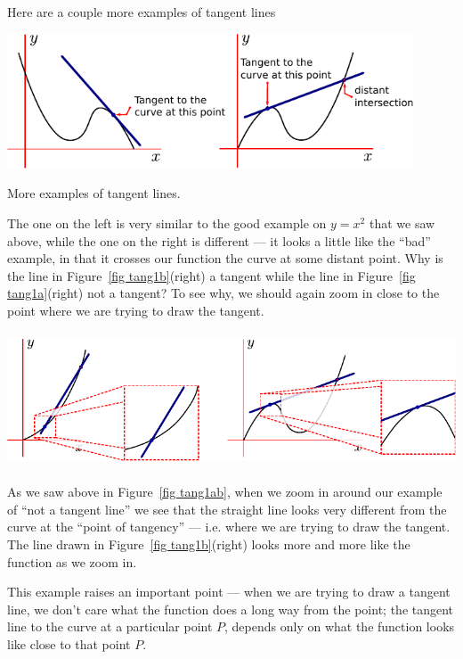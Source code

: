 Here are a couple more examples of tangent lines
\begin{fig}
\begin{center}
 \includegraphics[height=4cm]{tang1b}
\end{center}
More examples of tangent lines.
\label{fig tang1b}
\end{fig}
The one on the left is very similar to the good example on $y=x^2$ that we saw
above, while the one on the right is different --- it looks a little like the
``bad'' example, in that it crosses our function the curve at some distant
point. Why is the line in Figure~\ref{fig tang1b}(right) a tangent while the
line in Figure~\ref{fig tang1a}(right) not a tangent? To see why, we should
again zoom in close to the point where we are trying to draw the tangent.
\begin{fig}
\begin{center}
 \includegraphics[height=4cm]{tang1c}
\end{center}
\end{fig}
As we saw above in Figure~\ref{fig tang1ab}, when we zoom in around our example
of ``not a tangent line'' we see that the straight line looks very different
from the curve at the ``point of tangency'' --- i.e. where we are trying to draw
the tangent. The line drawn in Figure~\ref{fig tang1b}(right) looks more and
more like the function as we zoom in.

This example raises an important point --- when we are trying to draw a
tangent line, we don't care what the function does a long way from the
point; the tangent line to the curve at a particular point $P$, depends only on
what the function looks like close to that point $P$.

